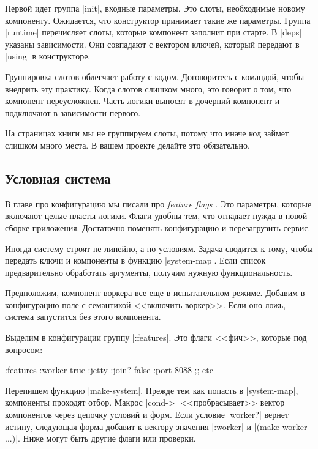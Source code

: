 Первой идет группа \spverb|init|, входные параметры. Это слоты, необходимые
новому компоненту. Ожидается, что конструктор принимает такие же
параметры. Группа \spverb|runtime| перечисляет слоты, которые компонент заполнит
при старте. В \spverb|deps| указаны зависимости. Они совпадают с вектором
ключей, который передают в \spverb|using| в конструкторе.

Группировка слотов облегчает работу с кодом. Договоритесь с командой, чтобы
внедрить эту практику. Когда слотов слишком много, это говорит о том, что
компонент переусложнен. Часть логики выносят в дочерний компонент и подключают в
зависимости первого.

На страницах книги мы не группируем слоты, потому что иначе код займет слишком
много места. В вашем проекте делайте это обязательно.

\subsection{Условная система}

В главе про конфигурацию мы писали про \emph{feature flags} .
Это параметры, которые включают целые пласты логики. Флаги удобны тем,
что отпадает нужда в новой сборке приложения. Достаточно поменять
конфигурацию и перезагрузить сервис.

Иногда систему строят не линейно, а по условиям. Задача сводится к тому, чтобы
передать ключи и компоненты в функцию \spverb|system-map|. Если список
предварительно обработать аргументы, получим нужную функциональность.

Предположим, компонент воркера все еще в испытательном режиме. Добавим в
конфигурацию поле с семантикой <<включить воркер>>. Если оно ложь, система
запустится без этого компонента.

Выделим в конфигурации группу \spverb|:features|. Это флаги <<фич>>, которые под
вопросом:

\begin{english}
  \begin{clojure}
{:features {:worker true}
 :jetty {:join? false :port 8088}
 ;; etc
}
  \end{clojure}
\end{english}

Перепишем функцию \spverb|make-system|. Прежде тем как попасть в
\spverb|system-map|, компоненты проходят отбор. Макрос \spverb|cond->|
<<пробрасывает>> вектор компонентов через цепочку условий и форм. Если условие
\spverb|worker?| вернет истину, следующая форма добавит к вектору значения
\spverb|:worker| и \spverb|(make-worker {...})|. Ниже могут быть другие флаги
или проверки.

